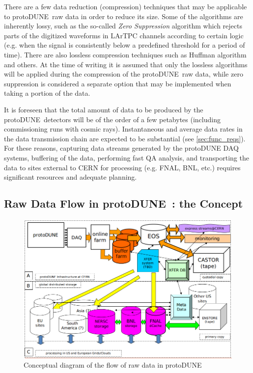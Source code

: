 \documentclass[pdftex,12pt,letter]{article}
\newcommand{\pd}{protoDUNE\ }
\begin{document}
There are a few data reduction (compression) techniques that may be applicable to \pd raw data in order to reduce its size. Some of the algorithms
are inherently lossy, such as the so-called \textit{Zero Suppression} algorithm which rejects parts of the digitized waveforms in LArTPC channels according
to certain logic (e.g. when the signal is consistently below a predefined threshold for a period of time). There are also lossless compression
techniques such as Huffman algorithm and others. At the time of writing it is assumed that only the lossless algorithms will be applied
during the compression
of the \pd raw data, while zero suppression is considered a separate option that may be implemented when taking a portion of the data.

It is foreseen that the total amount of data to be produced by the \pd detectors will be of the order of a few
petabytes (including commissioning runs with cosmic rays). Instantaneous and average data rates in the data transmission chain are expected to be
substantial (see \ref{sec:func_reqs}).
For these reasons, capturing data streams generated by the protoDUNE DAQ systems, buffering of the data, performing fast QA analysis,
and transporting the data to sites external to CERN for processing (e.g. FNAL, BNL, etc.) requires significant resources and adequate planning.

\subsection{Raw Data Flow in \pd: the Concept}
\label{sec:raw_concept}
\begin{figure}[tbh]
\centering\includegraphics[width=\linewidth]{protoDUNE_raw_data_concept.png}
\caption{\label{fig:raw_concept}Conceptual diagram of the flow of raw data in \pd}
\end{figure}
\end{document}
